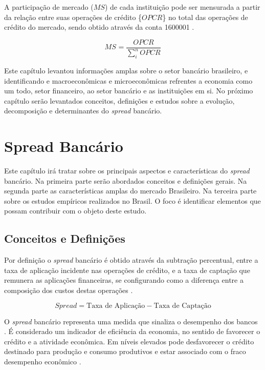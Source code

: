 \documentclass[12pt,openright,oneside,a4paper,chapter=TITLE,section=TITLE,subsection=TITLE,english,french,spanish,portugues,sumario=tradicional]{abntex2}
\begin{document}
A participação de mercado (\(MS\)) de cada instituição pode ser mensurada a partir da relação entre suas operações de crédito \{\(OPCR\)\} no total das operações de crédito do mercado, sendo obtido através da conta 1600001 \cite{dantas:2012}.

\[
MS_{} = \frac{OPCR_{}}{\sum_{i}^{n}OPCR_{}} 
\]

Este capítulo levantou informações amplas sobre o setor bancário brasileiro, e
identificando e macroeconômicas e microeconômicas refrentes a economia como um todo, setor financeiro, ao setor bancário e as instituições em si. No próximo capítulo serão levantados conceitos, definições e estudos sobre a evolução, decomposição e determinantes do \emph{spread} bancário.

\textual
\pagestyle{simple}

\section{Spread Bancário}

Este capítulo irá tratar sobre os principais aspectos e características do
\emph{spread} bancário. Na primeira parte serão abordados conceitos e definições
gerais. Na segunda parte as características amplas do mercado Brasileiro. Na
terceira parte sobre os estudos empíricos realizados no Brasil. O foco é
identificar elementos que possam contribuir com o objeto deste estudo.

\subsection{Conceitos e Definições}

Por definição o \emph{spread} bancário é obtido através da subtração percentual,
entre a taxa de aplicação incidente nas operações de crédito, e a taxa de
captação que remunera as aplicações financeiras, se configurando como a
diferença entre a composição dos custos destas operações \cite{BCB:2000}.

\[
Spread = \text{Taxa de Aplicação} - \text{Taxa de Captação}
\]

O \emph{spread} bancário representa uma medida que sinaliza o desempenho dos bancos
\cite{levine:1997}. É considerado um indicador de eficiência da economia, no
sentido de favorecer o crédito e a atividade econômica. Em níveis elevados pode
desfavorecer o crédito destinado para produção e consumo produtivos e estar
associado com o fraco desempenho econômico \cite{WB:2005}.
\end{document}
